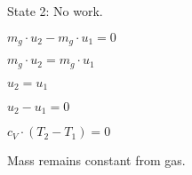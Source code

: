 State 2: No work.  

\( m_{g} \cdot u_2 - m_{g} \cdot u_1 = 0 \)  

\( m_{g} \cdot u_2 = m_{g} \cdot u_1 \)  

\( u_2 = u_1 \)  

\( u_2 - u_1 = 0 \)  

\( c_V \cdot (T_2 - T_1) = 0 \)  

Mass remains constant from gas.
